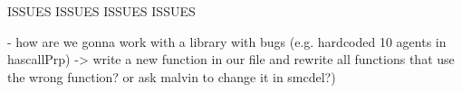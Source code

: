 ISSUES ISSUES ISSUES ISSUES 

- how are we gonna work with a library with bugs (e.g. hardcoded 10 agents in hascallPrp) -> write a new function in our file and rewrite all functions that use the wrong function? or ask malvin to change it in smcdel?)